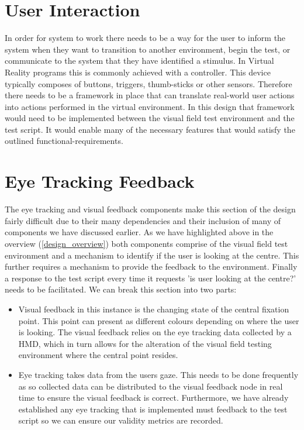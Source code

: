 \documentclass{l4proj}
\begin{document}
\section{User Interaction} \label{controller-ui}
In order for system to work there needs to be a way for the user to inform the system when they want to transition to another environment, begin the test, or communicate to the system that they have identified a stimulus. In Virtual Reality programs this is commonly achieved with a controller. This device typically composes of buttons, triggers, thumb-sticks or other sensors. Therefore there needs to be a framework in place that can translate real-world user actions into actions performed in the virtual environment. In this design that framework would need to be implemented between the visual field test environment and the test script. It would enable many of the necessary features that would satisfy the outlined functional-requirements. 
\section{Eye Tracking Feedback} \label{eye-tracking-ui}
The eye tracking and visual feedback components make this section of the design fairly difficult due to their many dependencies and their inclusion of many of components we have discussed earlier. As we have highlighted above in the overview (\ref{design_overview}) both components comprise of the visual field test environment and a mechanism to identify if the user is looking at the centre. This further requires a mechanism to provide the feedback to the environment. Finally a response to the test script every time it requests 'is user looking at the centre?' needs to be facilitated.
We can break this section into two parts:
\begin{itemize}
    \item Visual feedback in this instance is the changing state of the central fixation point. This point can present as different colours depending on where the user is looking. The visual feedback relies on the eye tracking data collected by a HMD, which in turn allows for the alteration of the visual field testing environment where the central point resides.

    \item Eye tracking takes data from the users gaze. This needs to be done frequently as so collected data can be distributed to the visual feedback node in real time to ensure the visual feedback is correct. Furthermore, we have already established any eye tracking that is implemented must feedback to the test script so we can ensure our validity metrics are recorded.
\end{itemize}
\end{document}
